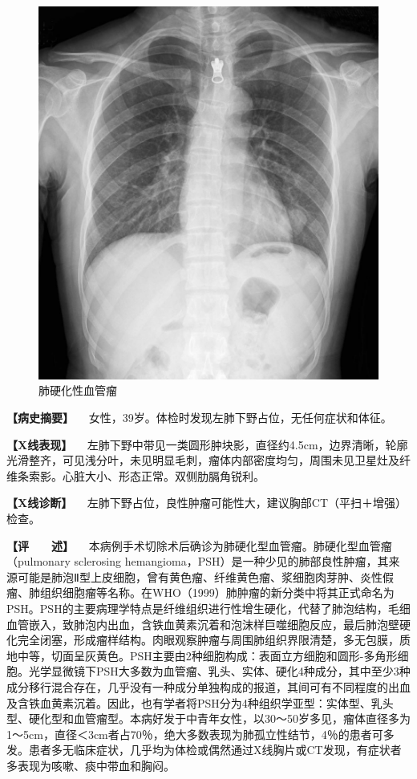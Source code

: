 \begin{figure}[!htbp]
 \centering
 \includegraphics{./images/Image00174.jpg}
 \captionsetup{justification=centering}
 \caption{肺硬化性血管瘤}
 \label{fig3-8-12}
  \end{figure} 

\textbf{【病史摘要】}
　女性，39岁。体检时发现左肺下野占位，无任何症状和体征。

\textbf{【X线表现】}
　左肺下野中带见一类圆形肿块影，直径约4.5cm，边界清晰，轮廓光滑整齐，可见浅分叶，未见明显毛刺，瘤体内部密度均匀，周围未见卫星灶及纤维条索影。心脏大小、形态正常。双侧肋膈角锐利。

\textbf{【X线诊断】}
　左肺下野占位，良性肿瘤可能性大，建议胸部CT（平扫＋增强）检查。

\textbf{【评　　述】}
　本病例手术切除术后确诊为肺硬化型血管瘤。肺硬化型血管瘤（pulmonary
sclerosing
hemangioma，PSH）是一种少见的肺部良性肿瘤，其来源可能是肺泡Ⅱ型上皮细胞，曾有黄色瘤、纤维黄色瘤、浆细胞肉芽肿、炎性假瘤、肺组织细胞瘤等名称。在WHO（1999）肺肿瘤的新分类中将其正式命名为PSH。PSH的主要病理学特点是纤维组织进行性增生硬化，代替了肺泡结构，毛细血管嵌入，致肺泡内出血，含铁血黄素沉着和泡沫样巨噬细胞反应，最后肺泡壁硬化完全闭塞，形成瘤样结构。肉眼观察肿瘤与周围肺组织界限清楚，多无包膜，质地中等，切面呈灰黄色。PSH主要由2种细胞构成：表面立方细胞和圆形-多角形细胞。光学显微镜下PSH大多数为血管瘤、乳头、实体、硬化4种成分，其中至少3种成分移行混合存在，几乎没有一种成分单独构成的报道，其间可有不同程度的出血及含铁血黄素沉着。因此，也有学者将PSH分为4种组织学亚型：实体型、乳头型、硬化型和血管瘤型。本病好发于中青年女性，以30～50岁多见，瘤体直径多为1～5cm，直径＜3cm者占70％，绝大多数表现为肺孤立性结节，4％的患者可多发。患者多无临床症状，几乎均为体检或偶然通过X线胸片或CT发现，有症状者多表现为咳嗽、痰中带血和胸闷。

